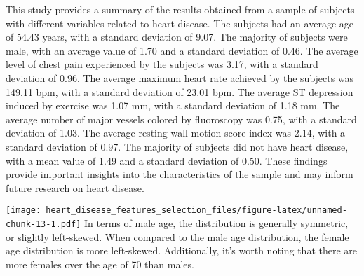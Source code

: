 \documentclass[
]{article}
\newenvironment{Shaded}{\begin{snugshade}}{\end{snugshade}}
\newcommand{\AttributeTok}[1]{\textcolor[rgb]{0.77,0.63,0.00}{#1}}
\newcommand{\CommentTok}[1]{\textcolor[rgb]{0.56,0.35,0.01}{\textit{#1}}}
\newcommand{\DecValTok}[1]{\textcolor[rgb]{0.00,0.00,0.81}{#1}}
\newcommand{\FunctionTok}[1]{\textcolor[rgb]{0.00,0.00,0.00}{#1}}
\newcommand{\NormalTok}[1]{#1}
\newcommand{\SpecialCharTok}[1]{\textcolor[rgb]{0.00,0.00,0.00}{#1}}
\newcommand{\StringTok}[1]{\textcolor[rgb]{0.31,0.60,0.02}{#1}}
\begin{document}
This study provides a summary of the results obtained from a sample of
subjects with different variables related to heart disease. The subjects
had an average age of 54.43 years, with a standard deviation of 9.07.
The majority of subjects were male, with an average value of 1.70 and a
standard deviation of 0.46. The average level of chest pain experienced
by the subjects was 3.17, with a standard deviation of 0.96. The average
maximum heart rate achieved by the subjects was 149.11 bpm, with a
standard deviation of 23.01 bpm. The average ST depression induced by
exercise was 1.07 mm, with a standard deviation of 1.18 mm. The average
number of major vessels colored by fluoroscopy was 0.75, with a standard
deviation of 1.03. The average resting wall motion score index was 2.14,
with a standard deviation of 0.97. The majority of subjects did not have
heart disease, with a mean value of 1.49 and a standard deviation of
0.50. These findings provide important insights into the characteristics
of the sample and may inform future research on heart disease.

\begin{Shaded}
\end{Shaded}

\texttt{[image: heart\_disease\_features\_selection\_files/figure-latex/unnamed-chunk-13-1.pdf]}
In terms of male age, the distribution is generally symmetric, or
slightly left-skewed. When compared to the male age distribution, the
female age distribution is more left-skewed. Additionally, it's worth
noting that there are more females over the age of 70 than males.
\end{document}
